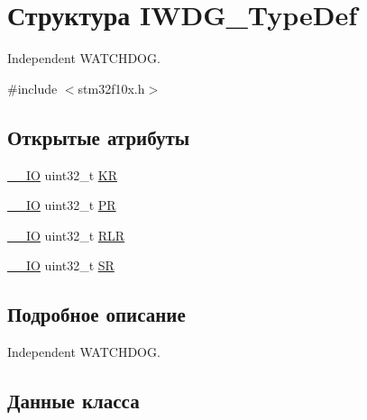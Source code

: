 \hypertarget{struct_i_w_d_g___type_def}{}\section{Структура I\+W\+D\+G\+\_\+\+Type\+Def}
\label{struct_i_w_d_g___type_def}


Independent W\+A\+T\+C\+H\+D\+OG.  




{\ttfamily \#include $<$stm32f10x.\+h$>$}

\subsection*{Открытые атрибуты}
\begin{DoxyCompactItemize}
\item 
\mbox{\hyperlink{group___c_m_s_i_s___c_m3__core__definitions_gaec43007d9998a0a0e01faede4133d6be}{\+\_\+\+\_\+\+IO}} uint32\+\_\+t \mbox{\hyperlink{struct_i_w_d_g___type_def_a63089aaa5f4ad34ee2677ebcdee49cd9}{KR}}
\item 
\mbox{\hyperlink{group___c_m_s_i_s___c_m3__core__definitions_gaec43007d9998a0a0e01faede4133d6be}{\+\_\+\+\_\+\+IO}} uint32\+\_\+t \mbox{\hyperlink{struct_i_w_d_g___type_def_a5f2717885ff171e686e0347af9e6b68d}{PR}}
\item 
\mbox{\hyperlink{group___c_m_s_i_s___c_m3__core__definitions_gaec43007d9998a0a0e01faede4133d6be}{\+\_\+\+\_\+\+IO}} uint32\+\_\+t \mbox{\hyperlink{struct_i_w_d_g___type_def_aa3703eaa40e447dcacc69c0827595532}{R\+LR}}
\item 
\mbox{\hyperlink{group___c_m_s_i_s___c_m3__core__definitions_gaec43007d9998a0a0e01faede4133d6be}{\+\_\+\+\_\+\+IO}} uint32\+\_\+t \mbox{\hyperlink{struct_i_w_d_g___type_def_a9bbfbe921f2acfaf58251849bd0a511c}{SR}}
\end{DoxyCompactItemize}


\subsection{Подробное описание}
Independent W\+A\+T\+C\+H\+D\+OG. 

\subsection{Данные класса}
\mbox{\label{struct_i_w_d_g___type_def_a63089aaa5f4ad34ee2677ebcdee49cd9}} 
